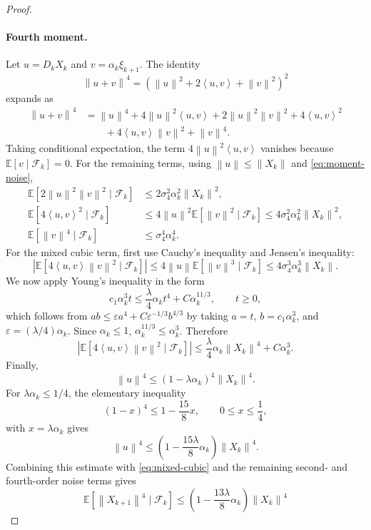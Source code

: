 \documentclass[10pt,a4paper]{amsart}
\newcommand{\E}{\mathbb{E}}
\newcommand{\ip}[2]{\left\langle #1,#2\right\rangle}
\newcommand{\norm}[1]{\left\lVert #1\right\rVert}
\begin{document}
\begin{proof}
\paragraph{Fourth moment.}
Let $u=D_kX_k$ and $v=\alpha_k\xi_{k+1}$. The identity
\[
  \norm{u+v}^4=(\norm{u}^2+2\ip{u}{v}+\norm{v}^2)^2
\]
expands as
\begin{align*}
  \norm{u+v}^4
  &=\norm{u}^4+4\norm{u}^2\ip{u}{v}
    +2\norm{u}^2\norm{v}^2+4\ip{u}{v}^2\\
  &\qquad +4\ip{u}{v}\norm{v}^2+\norm{v}^4.
\end{align*}
Taking conditional expectation, the term $4\norm{u}^2\ip{u}{v}$ vanishes because $\E[v\mid\mathcal F_k]=0$. For the remaining terms, using $\norm{u}\le\norm{X_k}$ and \eqref{eq:moment-noise},
\begin{align*}
  \E[2\norm{u}^2\norm{v}^2\mid\mathcal F_k]
  &\le 2\sigma_4^2\alpha_k^2\norm{X_k}^2,\\
  \E[4\ip{u}{v}^2\mid\mathcal F_k]
  &\le 4\norm{u}^2\E[\norm{v}^2\mid\mathcal F_k]
   \le 4\sigma_4^2\alpha_k^2\norm{X_k}^2,\\
  \E[\norm{v}^4\mid\mathcal F_k]
  &\le \sigma_4^4\alpha_k^4.
\end{align*}
For the mixed cubic term, first use Cauchy's inequality and Jensen's inequality:
\[
  \left|\E[4\ip{u}{v}\norm{v}^2\mid\mathcal F_k]\right|
  \le 4\norm{u}\E[\norm{v}^3\mid\mathcal F_k]
  \le 4\sigma_4^3\alpha_k^3\norm{X_k}.
\]
We now apply Young's inequality in the form
\[
  c_1\alpha_k^3 t
  \le \frac{\lambda}{4}\alpha_k t^4+C\alpha_k^{11/3},
  \qquad t\ge0, \label{eq:young-fourth}
\]
which follows from $ab\le \varepsilon a^4 + C\varepsilon^{-1/3}b^{4/3}$ by taking $a=t$, $b=c_1\alpha_k^3$, and $\varepsilon=(\lambda/4)\alpha_k$. Since $\alpha_k\le1$, $\alpha_k^{11/3}\le\alpha_k^3$. Therefore
\begin{equation}
  \left|\E[4\ip{u}{v}\norm{v}^2\mid\mathcal F_k]\right|
  \le \frac{\lambda}{4}\alpha_k\norm{X_k}^4+C\alpha_k^3. \label{eq:mixed-cubic}
\end{equation}
Finally,
\[
  \norm{u}^4\le(1-\lambda\alpha_k)^4\norm{X_k}^4.
\]
For $\lambda\alpha_k\le1/4$, the elementary inequality
\[
  (1-x)^4\le 1-\frac{15}{8}x,\qquad 0\le x\le\frac14,
\]
with $x=\lambda\alpha_k$ gives
\[
  \norm{u}^4\le \left(1-\frac{15\lambda}{8}\alpha_k\right)\norm{X_k}^4.
\]
Combining this estimate with \eqref{eq:mixed-cubic} and the remaining second- and fourth-order noise terms gives
\[
  \E[\norm{X_{k+1}}^4\mid\mathcal F_k]
  \le \left(1-\frac{13\lambda}{8}\alpha_k\right)\norm{X_k}^4
\]
\end{proof}
\end{document}
